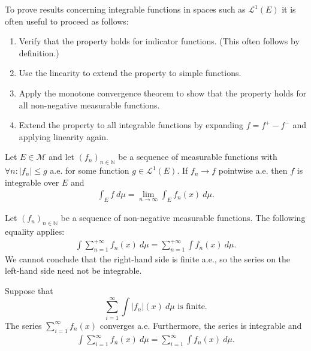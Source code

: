     \begin{method}\label{lebesgue:method:linear_proofs}
        To prove results concerning integrable functions in spaces such as $\mathcal{L}^1(E)$ it is often useful to proceed as follows:
        \begin{enumerate}
            \item Verify that the property holds for indicator functions. (This often follows by definition.)
            \item Use the linearity to extend the property to simple functions.
            \item Apply the monotone convergence theorem to show that the property holds for all non-negative measurable functions.
            \item Extend the property to all integrable functions by expanding $f = f^+ - f^-$ and applying linearity again.
        \end{enumerate}
    \end{method}

    \begin{theorem}\label{lebesgue:theorem:dominated_convergence_theorem}
        Let $E\in\mathcal{M}$ and let $(f_n)_{n\in\mathbb{N}}$ be a sequence of measurable functions with $\forall n:|f_n|\leq g$ a.e. for some function $g\in\mathcal{L}^1(E)$. If $f_n\rightarrow f$ pointwise a.e. then $f$ is integrable over $E$ and
        \begin{gather}
            \int_E f\ d\mu = \lim_{n\rightarrow\infty}\int_E f_n(x)\ d\mu.
        \end{gather}
    \end{theorem}

    \begin{property}[Interch]
        Let $(f_n)_{n\in\mathbb{N}}$ be a sequence of non-negative measurable functions. The following equality applies:
        \begin{gather}
            \int\sum_{n=1}^{+\infty}f_n(x)\ d\mu = \sum_{n=1}^{+\infty}\int f_n(x)\ d\mu.
        \end{gather}
        We cannot conclude that the right-hand side is finite a.e., so the series on the left-hand side need not be integrable.
    \end{property}

    \begin{theorem}\label{lebesgue:theorem:beppo_levi}
        Suppose that \[\sum_{i=1}^\infty\int|f_n|(x)\ d\mu\text{ is finite.}\] The series $\sum_{i=1}^\infty f_n(x)$ converges a.e. Furthermore, the series is integrable and
        \begin{gather}
            \int\sum_{i=1}^\infty f_n(x)\ d\mu = \sum_{i=1}^\infty\int f_n(x)\ d\mu.
        \end{gather}
    \end{theorem}

